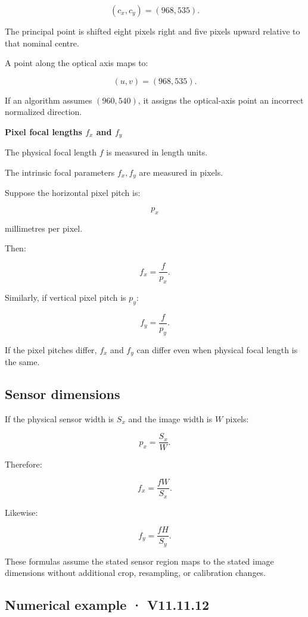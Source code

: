 \[
 (c_x,c_y)=(968,535).
\]

The principal point is shifted eight pixels right and five pixels upward relative to that nominal centre.

A point along the optical axis maps to:

\[
 \boxed{(u,v)=(968,535)}.
\]

If an algorithm assumes \((960,540)\), it assigns the optical-axis point an incorrect normalized direction.

\textbf{Pixel focal lengths \(f_x\) and \(f_y\)}

The physical focal length \(f\) is measured in length units.

The intrinsic focal parameters \(f_x,f_y\) are measured in pixels.

Suppose the horizontal pixel pitch is:

\[
 p_x
\]

millimetres per pixel.

Then:

\[
 \boxed{ f_x=\frac f{p_x} }.
\]

Similarly, if vertical pixel pitch is \(p_y\):

\[
 \boxed{ f_y=\frac f{p_y} }.
\]

If the pixel pitches differ, \(f_x\) and \(f_y\) can differ even when physical focal length is the same.

\subsection{Sensor dimensions}\label{02-foundations-ii-ch034-sensor-dimensions}

If the physical sensor width is \(S_x\) and the image width is \(W\) pixels:

\[
 p_x=\frac{S_x}{W}.
\]

Therefore:

\[
 \boxed{ f_x=\frac{fW}{S_x} }.
\]

Likewise:

\[
 \boxed{ f_y=\frac{fH}{S_y} }.
\]

These formulas assume the stated sensor region maps to the stated image dimensions without additional crop, resampling, or calibration changes.

\subsection{Numerical example · V11.11.12}\label{02-foundations-ii-ch034-numerical-example-v11.11.12}

